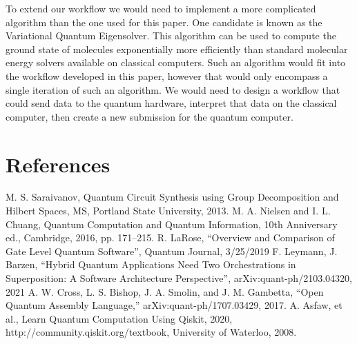 \documentclass[conference]{IEEEtran}
\begin{document}
To extend our workflow we would need to implement a more complicated algorithm than the one used for this paper. One candidate is known as the Variational Quantum Eigensolver. This algorithm can be used to compute the ground state of molecules exponentially more efficiently than standard molecular energy solvers available on classical computers. Such an algorithm would fit into the workflow developed in this paper, however that would only encompass a single iteration of such an algorithm. We would need to design a workflow that could send data to the quantum hardware, interpret that data on the classical computer, then create a new submission for the quantum computer.
\newpage
\section{References}
\begin{thebibliography}{00}
    \makeatletter
    \makeatother
     M. S. Saraivanov, Quantum Circuit Synthesis using Group Decomposition and Hilbert Spaces, MS, Portland State University, 2013.
     M. A. Nielsen and I. L. Chuang, Quantum Computation and Quantum Information, 10th Anniversary ed., Cambridge, 2016, pp. 171--215.
     R. LaRose, ``Overview and Comparison of Gate Level Quantum Software'', Quantum Journal, 3/25/2019
     F. Leymann, J. Barzen, ``Hybrid Quantum Applications Need Two Orchestrations in Superposition: A Software Architecture Perspective'', arXiv:quant-ph/2103.04320, 2021
     A. W. Cross, L. S. Bishop, J. A. Smolin, and J. M. Gambetta, ``Open Quantum Assembly Language,'' arXiv:quant-ph/1707.03429, 2017.      
     A. Asfaw, et al., Learn Quantum Computation Using Qiskit, 2020, {http://community.qiskit.org/textbook}, University of Waterloo, 2008.
\end{thebibliography}
\end{document}
